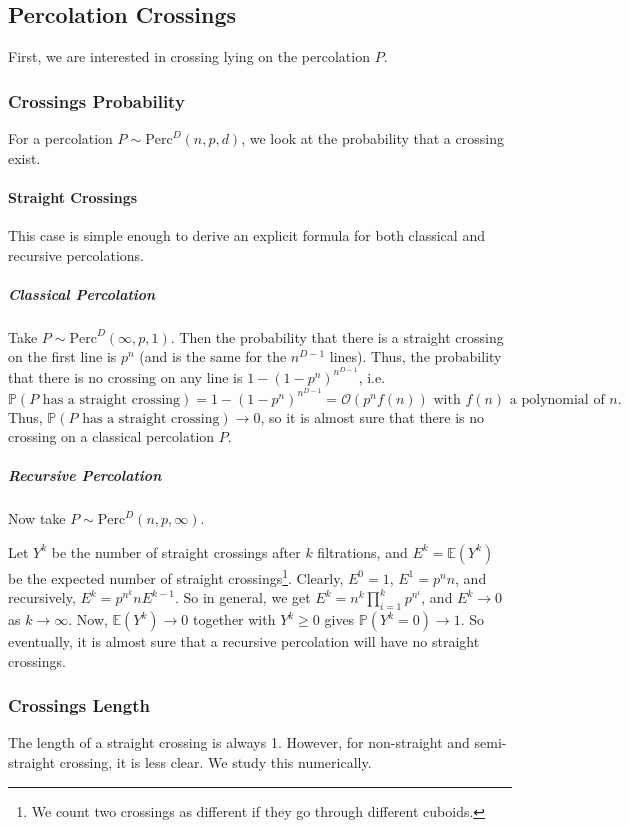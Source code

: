 \subsection{Percolation Crossings}
First, we are interested in crossing lying on the percolation $P$.

\subsubsection{Crossings Probability}
For a percolation $P \sim \text{Perc}^D(n,p,d)$, we look at the probability that a crossing exist.

\paragraph{Straight Crossings}
This case is simple enough to derive an explicit formula for both classical and recursive percolations.
\subparagraph{Classical Percolation}
Take $P \sim \text{Perc}^D(\infty,p,1)$.
Then the probability that there is a straight crossing on the first line is $p^n$ (and is the same for the $n^{D-1}$ lines).
Thus, the probability that there is no crossing on any line is $1-(1-p^n)^{n^{D-1}}$, i.e. 
$$\mathbb{P}(P \text{ has a straight crossing}) = 1-(1-p^n)^{n^{D-1}} = \mathcal{O}(p^n f(n)) \text{ with } f(n) \text{ a polynomial of } n.$$
Thus, $\mathbb{P}(P \text{ has a straight crossing}) \to 0$, so it is almost sure that there is no crossing on a classical percolation $P$.

\subparagraph{Recursive Percolation}
Now take $P \sim \text{Perc}^D(n,p,\infty)$.

Let $Y^k$ be the number of straight crossings after $k$ filtrations, and $E^k = \mathbb{E}(Y^k)$ be the expected number of straight crossings\footnote{We count two crossings as different if they go through different cuboids.}.
Clearly, $E^0 = 1$, $E^1 = p^nn$, and recursively, $E^k = p^{n^k}nE^{k-1}$.
So in general, we get $E^k = n^k \prod_{i=1}^{k} p^{n^i}$, and $E^k \to 0$ as $k \to \infty$.
Now, $\mathbb{E}(Y^k) \to 0$ together with $Y^k \geq 0$ gives $\mathbb{P}(Y^k = 0) \to 1$.
So eventually, it is almost sure that a recursive percolation will have no straight crossings.


\subsubsection{Crossings Length}
The length of a straight crossing is always 1.
However, for non-straight and semi-straight crossing, it is less clear.
We study this numerically.

